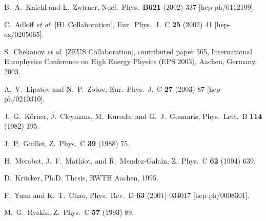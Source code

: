 \begin{thebibliography}{999}
B.~A.~Kniehl and L.~Zwirner,
Nucl.\ Phys.\ {\bf B621} (2002) 337
[hep-ph/0112199].

C.~Adloff {\it et al.}  [H1 Collaboration],
Eur.\ Phys.\ J.\ C {\bf 25} (2002) 41
[hep-ex/0205065].

S.~Chekanov {\it et al.}  [ZEUS Collaboration],
contributed paper 565, International Europhysics Conference 
on High Energy Physics (EPS 2003), Aachen, Germany, 2003. 

A.~V.~Lipatov and N.~P.~Zotov,
Eur.\ Phys.\ J.\ C {\bf 27} (2003) 87 
[hep-ph/0210310].

J.~G.~K\"orner, J.~Cleymans, M.~Kuroda, and G.~J.~Gounaris,
Phys.\ Lett.\ B {\bf 114} (1982) 195.

J.~P.~Guillet,
Z.\ Phys.\ C {\bf 39} (1988) 75.

H.~Merabet, J.~F.~Mathiot, and R.~Mendez-Galain,
Z.\ Phys.\ C {\bf 62} (1994) 639.

D.~Kr\"ucker, Ph.D. Thesis, RWTH Aachen, 1995.

F.~Yuan and K.~T.~Chao,
Phys.\ Rev.\ D {\bf 63} (2001) 034017
[hep-ph/0008301].


M.~G.~Ryskin,
Z.\ Phys.\ C {\bf 57} (1993) 89.


\end{thebibliography}
